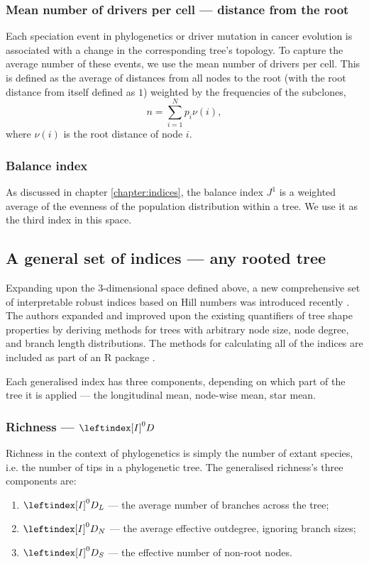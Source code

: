 \subsubsection{Mean number of drivers per cell --- distance from the root}
Each speciation event in phylogenetics or driver mutation in cancer evolution is associated with a change in the corresponding tree's topology. To capture the average number of these events, we use the mean number of drivers per cell. This is defined as the average of distances from all nodes to the root (with the root distance from itself defined as $1$) weighted by the frequencies of the subclones,
\begin{equation}
    n = \sum_{i=1}^N p_i \nu(i),
\end{equation}
where $\nu(i)$ is the root distance of node $i$.
\subsubsection{Balance index}
As discussed in chapter \ref{chapter:indices}, the balance index $J^1$ is a weighted average of the evenness of the population distribution within a tree. We use it as the third index in this space.

\subsection{A general set of indices --- any rooted tree}
Expanding upon the $3$-dimensional space defined above, a new comprehensive set of interpretable robust indices based on Hill numbers was introduced recently \cite{noble_new_2023}. The authors expanded and improved upon the existing quantifiers of tree shape properties by deriving methods for trees with arbitrary node size, node degree, and branch length distributions. The methods for calculating all of the indices are included as part of an R package \cite{kimverity_kimverityruiindices_2023}.\par
Each generalised index has three components, depending on which part of the tree it is applied --- the longitudinal mean, node-wise mean, star mean.
\subsubsection{Richness --- $\leftindex[I]^0{D}$}
Richness in the context of phylogenetics is simply the number of extant species, i.e. the number of tips in a phylogenetic tree. The generalised richness's three components are:
\begin{enumerate}
    \item $\leftindex[I]^0{D}_L$ --- the average number of branches across the tree;
    \item $\leftindex[I]^0{D}_N$ --- the average effective outdegree, ignoring branch sizes;
    \item $\leftindex[I]^0{D}_S$ --- the effective number of non-root nodes.
\end{enumerate}
